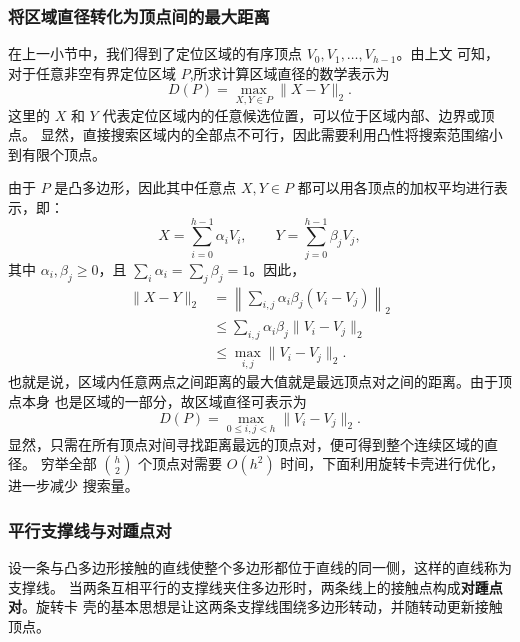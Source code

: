 \documentclass[withoutpreface,bwprint]{cumcmthesis} %
\begin{document}
\label{sec:p1-calipers}

\subsubsection{将区域直径转化为顶点间的最大距离}

在上一小节中，我们得到了定位区域的有序顶点 $V_0,V_1,\ldots,V_{h-1}$。由上文
可知，对于任意非空有界定位区域 $P$,所求计算区域直径的数学表示为
\begin{equation}
    D(P)=\max_{X,Y\in P}\|X-Y\|_2.
\end{equation}
这里的 $X$ 和 $Y$ 代表定位区域内的任意候选位置，可以位于区域内部、边界或顶点。
显然，直接搜索区域内的全部点不可行，因此需要利用凸性将搜索范围缩小到有限个顶点。

由于 $P$ 是凸多边形，因此其中任意点 $X,Y\in P$ 都可以用各顶点的加权平均进行表示，即：
\begin{equation}
    X=\sum_{i=0}^{h-1}\alpha_iV_i,\qquad
    Y=\sum_{j=0}^{h-1}\beta_jV_j,
\end{equation}
其中 $\alpha_i,\beta_j\ge0$，且 $\sum_i\alpha_i=\sum_j\beta_j=1$。因此，
\begin{equation}
\begin{aligned}
    \|X-Y\|_2
    &=\left\|\sum_{i,j}\alpha_i\beta_j(V_i-V_j)\right\|_2\\
    &\le\sum_{i,j}\alpha_i\beta_j\|V_i-V_j\|_2\\
    &\le\max_{i,j}\|V_i-V_j\|_2.
\end{aligned}
\end{equation}
也就是说，区域内任意两点之间距离的最大值就是最远顶点对之间的距离。由于顶点本身
也是区域的一部分，故区域直径可表示为
\begin{equation}\label{eq:p1-vertexdiam}
    D(P)=\max_{0\le i,j<h}\|V_i-V_j\|_2.
\end{equation}
显然，只需在所有顶点对间寻找距离最远的顶点对，便可得到整个连续区域的直径。
穷举全部 $\binom h2$ 个顶点对需要 $O(h^2)$ 时间，下面利用旋转卡壳进行优化，进一步减少
搜索量。

\subsubsection{平行支撑线与对踵点对}

设一条与凸多边形接触的直线使整个多边形都位于直线的同一侧，这样的直线称为支撑线。
当两条互相平行的支撑线夹住多边形时，两条线上的接触点构成\textbf{对踵点对}。旋转卡
壳的基本思想是让这两条支撑线围绕多边形转动，并随转动更新接触顶点。
\end{document}
